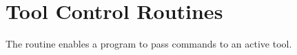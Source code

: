 %
%
%
%
%
%
%
%
%
%
%
%
%

\newpage  %
\section{Tool Control Routines}
\label{sec:control_tool}

\summary
The  routine enables a program to
pass commands to an active tool.

\format


